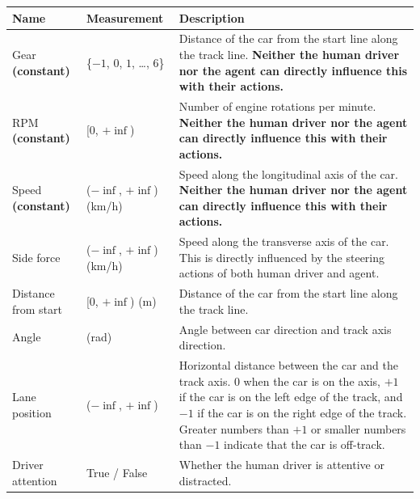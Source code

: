 \begin{tabularx}{\textwidth}{@{}p{}>{\centering}p{}X@{}}
\toprule
\textbf{Name}           & \textbf{Measurement}          & \textbf{Description}                                           \\ \midrule

Gear \newline \textbf{(constant)} & \{$-1$, $0$, $1$,  \dots, $6$\} & Distance of the car from the start line along the track line. \textbf{Neither the human driver nor the agent can directly influence this with their actions.} \\ \midrule

RPM \newline \textbf{(constant)} & [0, $+\inf$) & Number of engine rotations per minute. \textbf{Neither the human driver nor the agent can directly influence this with their actions.} \\ \midrule

Speed \newline \textbf{(constant)}  & ($-\inf$, $+\inf$) (km/h) & Speed along the longitudinal axis of the car. \textbf{Neither the human driver nor the agent can directly influence this with their actions.} \\ \midrule


Side force & ($-\inf$, $+\inf$) (km/h) & Speed along the transverse axis of the car. This is directly influenced by the steering actions of both human driver and agent. \\ \midrule

Distance from start & [0, $+\inf$) (m) & Distance of the car from the start line along the track line. \\ \midrule

Angle          & [$-\pi$, $+\pi$] (rad) & Angle between car direction and track axis direction.  \\ \midrule

Lane position & ($-\inf$, $+\inf$)     & Horizontal distance between the car and the track axis. $0$ when the car is on the axis, $+1$ if the car is on the left edge of the track, and $-1$ if the car is on the right edge of the track. Greater numbers than $+1$ or smaller numbers than $-1$ indicate that the car is off-track. \\ \midrule

Driver attention & True / False & Whether the human driver is attentive or distracted.  \\ \bottomrule

\end{tabularx}

